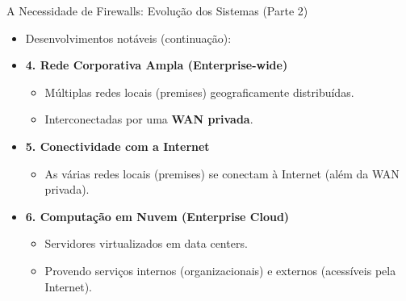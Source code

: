 \begin{frame}{A Necessidade de Firewalls: Evolução dos Sistemas (Parte 2)}
    \begin{itemize}
        \item Desenvolvimentos notáveis (continuação):

        \item \textbf{4. Rede Corporativa Ampla (Enterprise-wide)}
              \begin{itemize}
                  \item Múltiplas redes locais (premises) geograficamente distribuídas.
                  \item Interconectadas por uma \textbf{WAN privada}.
              \end{itemize}

        \item \textbf{5. Conectividade com a Internet}
              \begin{itemize}
                  \item As várias redes locais (premises) se conectam à Internet (além da WAN privada).
              \end{itemize}

        \item \textbf{6. Computação em Nuvem (Enterprise Cloud)}
              \begin{itemize}
                  \item Servidores virtualizados em data centers.
                  \item Provendo serviços internos (organizacionais) e externos (acessíveis pela Internet).
              \end{itemize}
    \end{itemize}
\end{frame}

